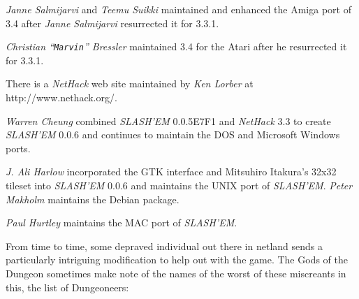 {\it Janne Salmijarvi\/} and {\it Teemu Suikki\/} maintained and 
enhanced the Amiga port of 3.4 after {\it Janne Salmijarvi\/} resurrected 
it for 3.3.1.

{\it Christian ``{\tt Marvin}'' Bressler\/} maintained 3.4 for the Atari after he 
resurrected it for 3.3.1.

There is a {\it NetHack\/} web site maintained by {\it Ken Lorber\/} at http://www.nethack.org/.


{\it Warren Cheung\/} combined {\it SLASH'EM\/} 0.0.5E7F1 and {\it NetHack\/} 3.3 to create
{\it SLASH'EM\/} 0.0.6 and continues to maintain the DOS and Microsoft Windows ports.

{\it J. Ali Harlow\/} incorporated the GTK interface and Mitsuhiro Itakura's
32x32 tileset into {\it SLASH'EM\/} 0.0.6 and maintains the UNIX port of {\it SLASH'EM}.
{\it Peter Makholm\/} maintains the Debian package.

{\it Paul Hurtley\/} maintains the MAC port of {\it SLASH'EM}.

			  \bigskip

From time to time, some depraved individual out there in netland sends a
particularly intriguing modification to help out with the game.  The Gods of
the Dungeon sometimes make note of the names of the worst of these miscreants
in this, the list of Dungeoneers:

